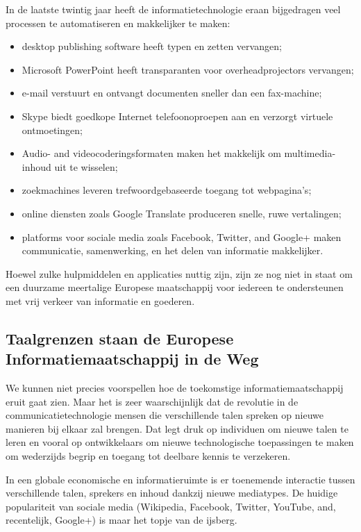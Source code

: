 \documentclass[]{../../metanetpaper}
\begin{document}
\begin{multicols}{2}
     In de laatste twintig jaar heeft de informatietechnologie eraan bijgedragen veel processen te automatiseren en makkelijker te maken:
    \begin{itemize}
 	\item desktop publishing software heeft typen en zetten vervangen;
 	\item Microsoft PowerPoint heeft transparanten voor overheadprojectors vervangen;
 	\item e-mail verstuurt en ontvangt documenten sneller dan een fax-machine;
 	\item Skype biedt goedkope Internet telefoonoproepen aan en verzorgt virtuele ontmoetingen;
 	\item Audio- and videocoderingsformaten maken het makkelijk om multimedia-inhoud uit te wisselen;
 	\item zoekmachines leveren trefwoordgebaseerde toegang tot webpagina's;
 	\item online diensten zoals Google Translate produceren snelle, ruwe vertalingen;
 	\item platforms voor sociale media zoals Facebook, Twitter, and Google+ maken communicatie, samenwerking, en het delen van informatie makkelijker.
     \end{itemize}

     Hoewel zulke hulpmiddelen en applicaties nuttig zijn, zijn ze nog niet in staat om een duurzame meertalige Europese maatschappij voor iedereen te ondersteunen met vrij verkeer van informatie en goederen.



\subsection{Taalgrenzen staan de Europese Informatiemaatschappij in de Weg}

    We kunnen niet precies voorspellen hoe de toekomstige informatiemaatschappij eruit gaat zien. Maar het is zeer waarschijnlijk dat de revolutie in de communicatietechnologie mensen die verschillende talen spreken op nieuwe manieren bij elkaar zal brengen. Dat legt druk op individuen om nieuwe talen te leren en vooral op ontwikkelaars om nieuwe technologische toepassingen te maken om wederzijds begrip en toegang tot deelbare kennis te verzekeren.


 In een globale economische en informatieruimte is er toenemende interactie tussen verschillende  talen, sprekers en inhoud dankzij nieuwe mediatypes. De huidige populariteit van sociale media (Wikipedia, Facebook, Twitter, YouTube, and, recentelijk, Google+) is maar het topje van de ijsberg.


\end{multicols}
\end{document}
